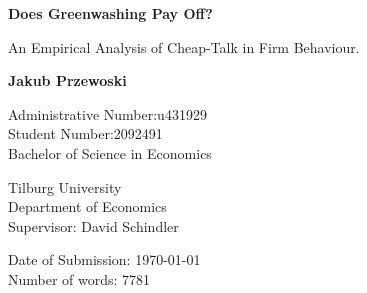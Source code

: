 \begin{titlepage}
    \begin{center}
        \vspace*{1cm}
 
        \Large
        \textbf{Does Greenwashing Pay Off?}
 
        \vspace{0.5cm}
        An Empirical Analysis of Cheap-Talk in Firm Behaviour.
        
        \vspace{1.5cm}
        
        \textbf{Jakub Przewoski}
        
        \vspace{0.5cm}
        \large
        Administrative Number:\@ u431929\\ 
        Student Number:\@ 2092491 \\
        Bachelor of Science in Economics \\
        
        \vfill
        
        Tilburg University\\
        Department of Economics\\
        Supervisor: David Schindler\\
        
        \vspace{0.8cm}
        
        Date of Submission: \today{} \\
        Number of words: 7781

            
    \end{center}
\end{titlepage}
